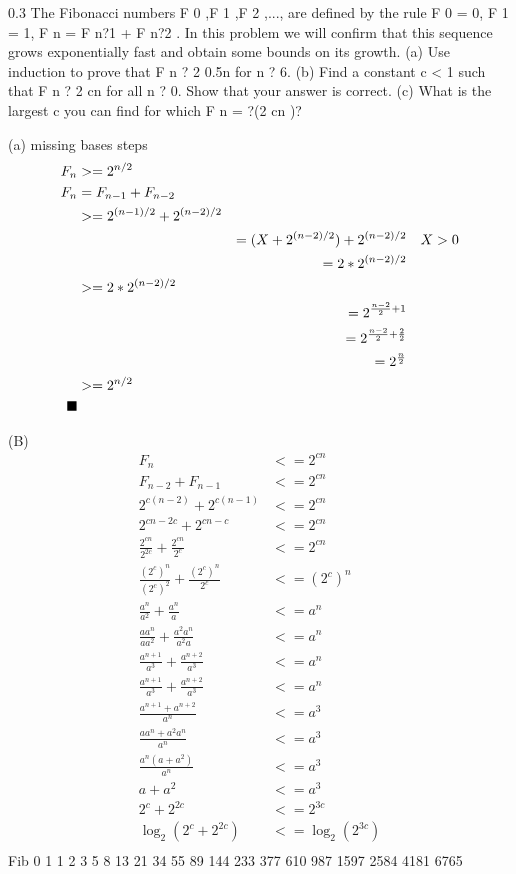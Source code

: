 \documentclass[10pt,a4paper]{article}
\newcommand{\qed}{\hfill\blacksquare}
\begin{document}
0.3
The Fibonacci numbers F 0 ,F 1 ,F 2 ,..., are defined by the rule
F 0 = 0, F 1 = 1, F n = F n?1 + F n?2 .
In this problem we will confirm that this sequence grows exponentially fast and obtain some
bounds on its growth.
(a) Use induction to prove that F n ? 2 0.5n for n ? 6.
(b) Find a constant c < 1 such that F n ? 2 cn for all n ? 0. Show that your answer is correct.
(c) What is the largest c you can find for which F n = ?(2 cn )?

(a)
missing bases steps
\begin{align*}
F_n &>= 2^{n/2}\\
F_n &= F_{n-1}+F_{n-2}\\
&>= 2^{(n-1)/2} + 2^{(n-2)/2}\\
& &= (X+2^{(n-2)/2}) + 2^{(n-2)/2} &&\text{$X>0$}\\
& &= 2*2^{(n-2)/2}\\
&>= 2*2^{(n-2)/2}\\
& &=2^{\frac{n-2}{2}+1}\\
& &=2^{\frac{n-2}{2}+\frac{2}{2}}\\
& &=2^{\frac{n}{2}}\\
&>= 2^{n/2}\\
\qed
\end{align*}

(B)
\begin{align*}
	F_n &<= 2^{cn}\\
	F_{n-2} + F_{n-1} &<= 2^{cn}\\
	2^{c(n-2)} + 2^{c(n-1)} &<= 2^{cn}\\
	2^{cn-2c} + 2^{cn-c} &<= 2^{cn}\\
	\frac{2^{cn}}{2^{2c}} + \frac{2^{cn}}{2^c} &<= 2^{cn}\\
	\frac{(2^{c})^n}{(2^{c})^2} + \frac{(2^{c})^n}{2^c} &<= (2^{c})^n\\
	\frac{a^n}{a^2} + \frac{a^n}{a} &<= a^n\\
	\frac{aa^n}{aa^2} + \frac{a^2a^n}{a^2a} &<= a^n\\
	\frac{a^{n+1}}{a^3} + \frac{a^{n+2}}{a^3} &<= a^n\\
	\frac{a^{n+1}}{a^3} + \frac{a^{n+2}}{a^3} &<= a^n\\
	\frac{a^{n+1}+a^{n+2}}{a^n} &<= a^3\\
	\frac{aa^n+a^2a^n}{a^n} &<= a^3\\
	\frac{a^n(a+a^2)}{a^n} &<= a^3\\
	a+a^2 &<= a^3\\
	2^c+2^{2c}&<=2^{3c}\\
	\log_2{(2^c+2^{2c})}&<=\log_2{(2^{3c})}\\
\end{align*}
Fib
0
1
1
2
3
5
8
13
21
34
55
89
144
233
377
610
987
1597
2584
4181
6765
\end{document}
